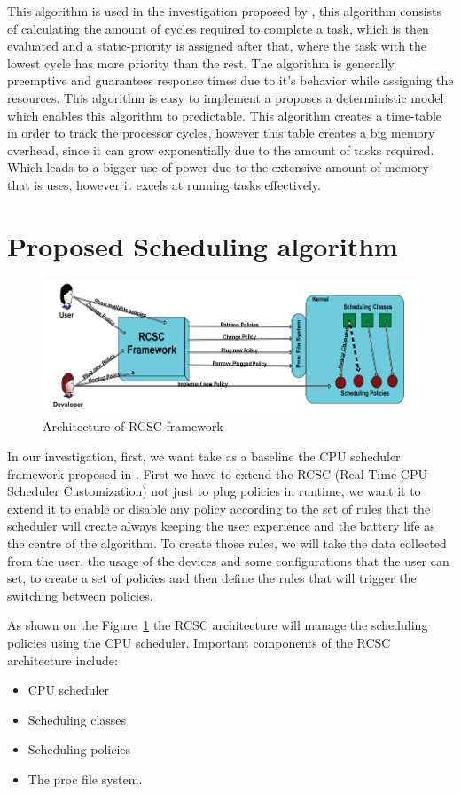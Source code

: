 \documentclass[conference]{IEEEtran}
\begin{document}
This algorithm is used in the investigation proposed by \cite{BECKER01}, this algorithm consists of calculating the amount of cycles required to complete a task, which is then evaluated and a static-priority is assigned after that, where the task with the lowest cycle has more priority than the rest. The algorithm is generally preemptive and guarantees response times due to it's behavior while assigning the resources. 
This algorithm is easy to implement a proposes a deterministic model which enables this algorithm to predictable. This algorithm creates a time-table in order to track the processor cycles, however this table creates a big memory overhead, since it can grow exponentially due to the amount of tasks required. Which leads to a bigger use of power due to the extensive amount of memory that is uses, however it excels at running tasks effectively. 


\section{Proposed Scheduling algorithm}

\begin{figure}[ht]
\centering
  \includegraphics[width=\textwidth,height=4cm]{RSCS}
  \caption{Architecture of RCSC framework \cite{ALMA01}}
  \label{fig:RCSC}
\end{figure}

In our investigation, first, we want take as a baseline the CPU scheduler framework proposed in \cite{ALMA01}. First we have to extend the RCSC (Real-Time CPU Scheduler Customization) not just to plug policies in runtime, we want it to extend it to enable or disable any policy according to the set of rules that the scheduler will create always keeping the user experience and the battery life as the centre of the algorithm. To create those rules, we will take the data collected from the user, the usage of the devices and some configurations that the user can set, to create a set of policies and then define the rules that will trigger the switching between policies.

As shown on the Figure~\ref{fig:RCSC} the RCSC architecture will  manage the scheduling policies using the CPU scheduler. Important components of the RCSC architecture include:
\begin{itemize} 
\item CPU scheduler
\item Scheduling classes
\item Scheduling policies
\item The proc file system. 
\end{itemize}
\end{document}
